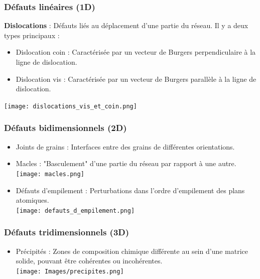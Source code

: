 \documentclass{article}
\begin{document}
        \subsubsection{Défauts linéaires (1D)}
        \textbf{Dislocations} : Défauts liés au déplacement d'une partie du réseau. Il y a deux types principaux :
        \begin{itemize}
            \item Dislocation coin : Caractérisée par un vecteur de Burgers perpendiculaire à la ligne de dislocation.
            \item Dislocation vis : Caractérisée par un vecteur de Burgers parallèle à la ligne de dislocation.
        \end{itemize}
        \texttt{[image: dislocations\_vis\_et\_coin.png]}
        
        \subsubsection{Défauts bidimensionnels (2D)}
        \begin{itemize}
            \item Joints de grains : Interfaces entre des grains de différentes orientations.
            \item Macles : "Basculement" d’une partie du réseau par rapport à une autre. \\
            \texttt{[image: macles.png]}
            \item Défauts d'empilement : Perturbations dans l'ordre d'empilement des plans atomiques. \\
            \texttt{[image: defauts\_d\_empilement.png]}
        \end{itemize}
        
        
        \subsubsection{Défauts tridimensionnels (3D)}
        \begin{itemize}
            \item Précipités : Zones de composition chimique différente au sein d'une matrice solide, pouvant être cohérentes ou incohérentes. \\
            \texttt{[image: Images/precipites.png]}
        \end{itemize}
        \pagebreak
\end{document}

